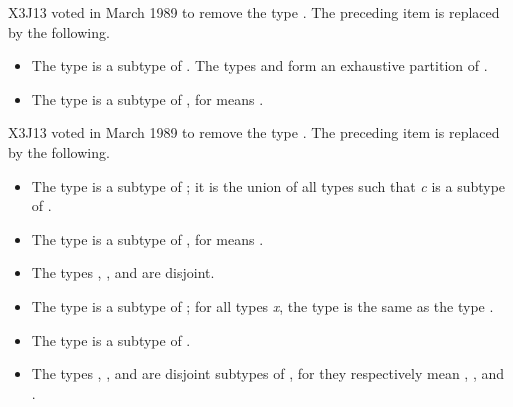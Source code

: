 {\begin{newer}
X3J13 voted in March 1989  to remove the type .
The preceding item is replaced by the following.
\begin{itemize}
\item
The type  is a subtype of .
The types  and 
form an exhaustive partition of .
\end{itemize}
\end{newer}

\begin{obsolete}
\begin{itemize}
\item
The type  is a subtype of , for 
means .
\end{itemize}
\end{obsolete}

\newpage%
\begin{newer}
X3J13 voted in March 1989  to remove the type .
The preceding item is replaced by the following.
\begin{itemize}
\item
The type  is a subtype of ; it is the union of
all types  such that {\it c} is a subtype of .
\end{itemize}
\end{newer}

\begin{itemize}
\item
The type  is a subtype of , for 
means .

\item
The types , , and  are disjoint.

\item
The type  is a subtype of ; for all types {\it x},
the type  is the same as the type .

\item
The type  is a subtype of .
\end{itemize}

\begin{obsolete}
\begin{itemize}
\item
The types , , and
 are disjoint subtypes of , for they
respectively mean , ,
and .
\end{itemize}
\end{obsolete}

}
